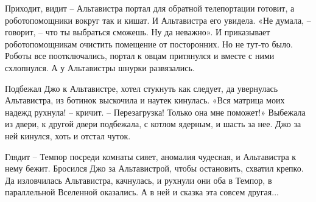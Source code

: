 \documentclass[ebook,oneside,final,openright]{memoir}
\begin{document}
\par
Приходит, видит – Альтавистра портал для обратной телепортации готовит, а роботопомощники вокруг так и кишат. И Альтавистра его увидела. «Не думала, – говорит, – что ты выбраться сможешь. Ну да неважно». И приказывает роботопомощникам очистить помещение от посторонних. Но не тут-то было. Роботы все поотключались, портал к овцам притянулся и вместе с ними схлопнулся. А у Альтавистры шнурки развязались.\par
\par
Подбежал Джо к Альтавистре, хотел стукнуть как следует, да увернулась Альтавистра, из ботинок выскочила и наутек кинулась. «Вся матрица моих надежд рухнула! – кричит. – Перезагрузка! Только она мне поможет!» Выбежала из двери, к другой двери подбежала, с котлом ядерным, и шасть за нее. Джо за ней кинулся, хоть и отстал чуток.\par
\par
Глядит – Темпор посреди комнаты сияет, аномалия чудесная, и Альтавистра к нему бежит. Бросился Джо за Альтавистрой, чтобы остановить, схватил крепко. Да изловчилась Альтавистра, качнулась, и рухнули они оба в Темпор, в параллельной Вселенной оказались. А в ней и сказка эта совсем другая...\par
\end{document}
